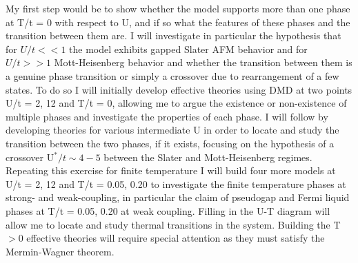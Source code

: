 \documentclass[12pt]{article}
\begin{document}
My first step would be to show whether the model supports more than one phase at T/t = 0 with respect to U, and if so what the features of these phases and the transition between them are.
I will investigate in particular the hypothesis that for $U/t<<1$ the model exhibits gapped Slater AFM behavior and for $U/t>>1$ Mott-Heisenberg behavior and whether the transition between them is a genuine phase transition or simply a crossover due to rearrangement of a few states.
To do so I will initially develop effective theories using DMD at two points U/t = 2, 12 and T/t = 0, allowing me to argue the existence or non-existence of multiple phases and investigate the properties of each phase.
I will follow by developing theories for various intermediate U in order to locate and study the transition between the two phases, if it exists, focusing on the hypothesis of a crossover U$^*/t\sim 4 - 5$ between the Slater and Mott-Heisenberg regimes.
Repeating this exercise for finite temperature I will build four more models at U/t = 2, 12 and T/t = 0.05, 0.20 to investigate the finite temperature phases at strong- and weak-coupling, in particular the claim of pseudogap and Fermi liquid phases at T/t = 0.05, 0.20 at weak coupling.
Filling in the U-T diagram will allow me to locate and study thermal transitions in the system. 
Building the T$>$0 effective theories will require special attention as they must satisfy the Mermin-Wagner theorem.
\end{document}
